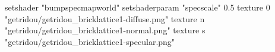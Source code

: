 setshader "bumpspecmapworld"
setshaderparam "specscale" 0.5
texture 0 "getridou/getridou_bricklattice1-diffuse.png"
texture n "getridou/getridou_bricklattice1-normal.png"
texture s "getridou/getridou_bricklattice1-specular.png"
